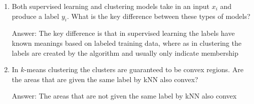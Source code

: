 \documentclass{article}
\newcommand{\gre}[1]{\textcolor{gre}{#1}}
\newcommand\ans[1]{\par\gre{Answer: #1}}
\begin{document}
\begin{enumerate}
\begin{enumerate}
            \item Our estimate of $p(x_{ij} \mid y_i)$ for some $x_{ij}$ and $y_i$.
            \ans{parameter}

            \item The value $\beta$ in Laplace smoothing.
            \ans{hyper-parameter}

        \end{enumerate}

        \item Both supervised learning and clustering models take in an input $x_i$ and produce a label $y_i$. What is the key difference between these types of models?
        \ans{The key difference is that in supervised learning the labels have known meanings based on labeled training data, where as in clustering
        the labels are created by the algorithm and usually only indicate membership}

        \item In $k$-means clustering the clusters are guaranteed to be convex regions. Are the areas that are given the same label by kNN also convex?
        \ans{The areas that are not given the same label by kNN also convex}

    \end{enumerate}
\end{document}
